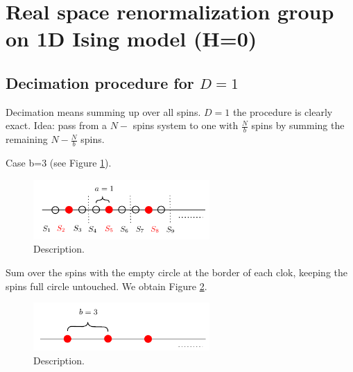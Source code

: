 \documentclass[../main/main.tex]{subfiles}
\begin{document}
\section{Real space renormalization group on 1D Ising model (H=0)}


\subsection{Decimation procedure for \( D=1 \)}
Decimation means summing up over all spins.
\( D=1 \) the procedure is clearly exact. Idea: pass from a \( N- \) spins system to one with \( \frac{N}{b} \) spins by summing the remaining \( N- \frac{N}{b} \) spins.


Case b=3 (see Figure \ref{fig:20_1}).

\begin{figure}[h!]
\centering
\includegraphics[width=0.6\textwidth]{../lessons/20_image/1.pdf}
\caption{\label{fig:20_1} Description.}
\end{figure}

Sum over the spins with the empty circle at the border of each clok, keeping the spins full circle untouched.
We obtain Figure \ref{fig:20_2}.

\begin{figure}[h!]
\centering
\includegraphics[width=0.6\textwidth]{../lessons/20_image/2.pdf}
\caption{\label{fig:20_2} Description.}
\end{figure}
\end{document}
